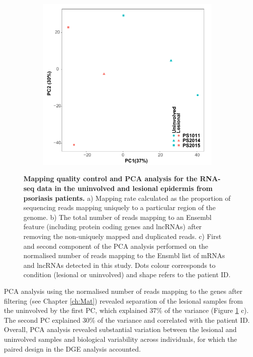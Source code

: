 \begin{figure}[htbp]
\begin{subfigure}{0.4\textwidth}
\centering
\includegraphics[width=\textwidth]{./Results2/pdfs/PS_lesional_uninvolved_varied_PCA1and2_plot}
\caption{\textbf{}} %
\end{subfigure}%
\caption[Mapping quality control and PCA analysis for the RNA-seq data in the uninvolved and lesional epidermis from psoriasis patients.]{\textbf{Mapping quality control and PCA analysis for the RNA-seq data in the uninvolved and lesional epidermis from psoriasis patients.} a) Mapping rate calculated as the proportion of sequencing reads mapping uniquely to a particular region of the genome. b) The total number of reads mapping to an Ensembl feature (including protein coding genes and lncRNAs) after removing the non-uniquely mapped and duplicated reads. c) First and second component of the PCA analysis performed on the normalised number of reads mapping to the Ensmbl list of mRNAs and lncRNAs detected in this study. Dots colour corresponds to condition (lesional or uninvolved) and shape refers to the patient ID.}
\label{figure:RNAseq_PS_uninvolved_lesional_psoriasis_skin_mapping_and_PCA}
\end{figure} 

PCA analysis using the normalised number of reads mapping to the genes after filtering (see Chapter \ref{ch:Mat}) revealed separation of the lesional samples from the uninvolved by the first PC, which explained 37\% of the variance (Figure \ref{figure:RNAseq_PS_uninvolved_lesional_psoriasis_skin_mapping_and_PCA} c). The second PC explained 30\% of the variance and correlated with the patient ID. Overall, PCA analysis revealed substantial variation between the lesional and uninvolved samples and biological variability across individuals, for which the paired design in the DGE analysis accounted.  


